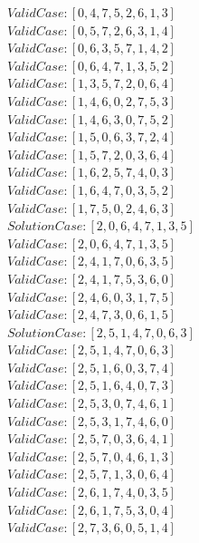 \documentclass[10pt,a4paper]{article}
\begin{document}
				$Valid Case   : [0, 4, 7, 5, 2, 6, 1, 3]$\\
				$Valid Case   : [0, 5, 7, 2, 6, 3, 1, 4]$\\
				$Valid Case   : [0, 6, 3, 5, 7, 1, 4, 2]$\\
				$Valid Case   : [0, 6, 4, 7, 1, 3, 5, 2]$\\
				$Valid Case   : [1, 3, 5, 7, 2, 0, 6, 4]$\\
				$Valid Case   : [1, 4, 6, 0, 2, 7, 5, 3]$\\
				$Valid Case   : [1, 4, 6, 3, 0, 7, 5, 2]$\\
				$Valid Case   : [1, 5, 0, 6, 3, 7, 2, 4]$\\
				$Valid Case   : [1, 5, 7, 2, 0, 3, 6, 4]$\\
				$Valid Case   : [1, 6, 2, 5, 7, 4, 0, 3]$\\
				$Valid Case   : [1, 6, 4, 7, 0, 3, 5, 2]$\\
				$Valid Case   : [1, 7, 5, 0, 2, 4, 6, 3]$\\
				$Solution Case: [2, 0, 6, 4, 7, 1, 3, 5]$\\
				$Valid Case   : [2, 0, 6, 4, 7, 1, 3, 5]$\\
				$Valid Case   : [2, 4, 1, 7, 0, 6, 3, 5]$\\
				$Valid Case   : [2, 4, 1, 7, 5, 3, 6, 0]$\\
				$Valid Case   : [2, 4, 6, 0, 3, 1, 7, 5]$\\
				$Valid Case   : [2, 4, 7, 3, 0, 6, 1, 5]$\\
				$Solution Case: [2, 5, 1, 4, 7, 0, 6, 3]$\\
				$Valid Case   : [2, 5, 1, 4, 7, 0, 6, 3]$\\
				$Valid Case   : [2, 5, 1, 6, 0, 3, 7, 4]$\\
				$Valid Case   : [2, 5, 1, 6, 4, 0, 7, 3]$\\
				$Valid Case   : [2, 5, 3, 0, 7, 4, 6, 1]$\\
				$Valid Case   : [2, 5, 3, 1, 7, 4, 6, 0]$\\
				$Valid Case   : [2, 5, 7, 0, 3, 6, 4, 1]$\\
				$Valid Case   : [2, 5, 7, 0, 4, 6, 1, 3]$\\
				$Valid Case   : [2, 5, 7, 1, 3, 0, 6, 4]$\\
				$Valid Case   : [2, 6, 1, 7, 4, 0, 3, 5]$\\
				$Valid Case   : [2, 6, 1, 7, 5, 3, 0, 4]$\\
				$Valid Case   : [2, 7, 3, 6, 0, 5, 1, 4]$\\
\end{document}
